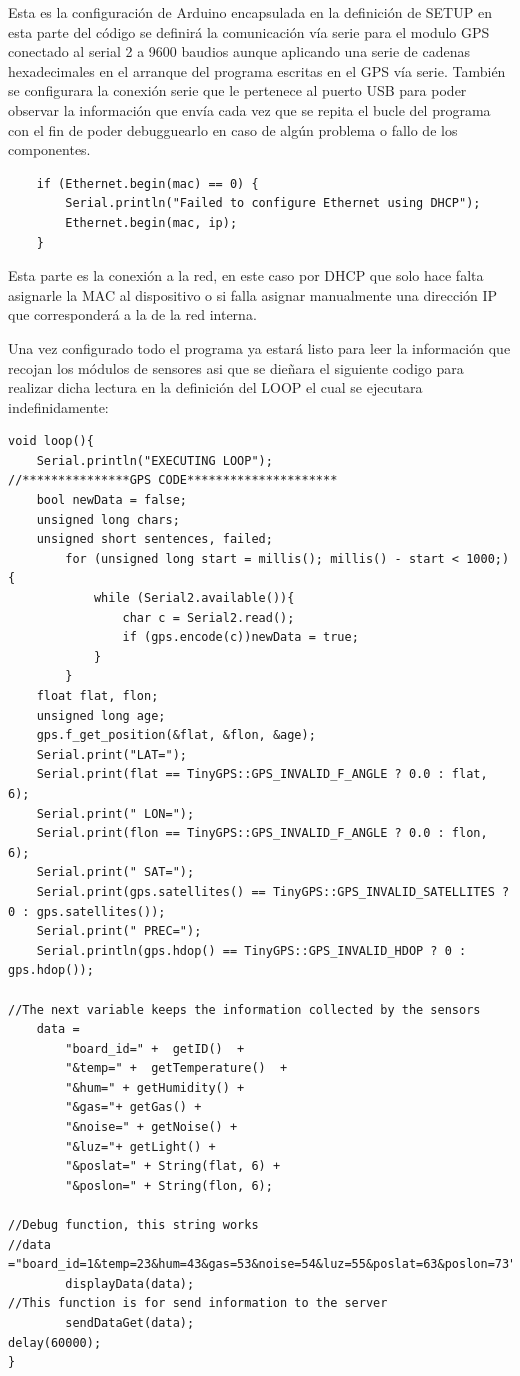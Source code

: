 Esta es la configuración de Arduino encapsulada en la definición de SETUP en esta parte del código se definirá la comunicación vía serie para el modulo GPS conectado al serial 2 a 9600 baudios aunque aplicando una serie de cadenas hexadecimales en el arranque del programa escritas en el GPS vía serie.
También se configurara la conexión serie que le pertenece al puerto USB para poder observar la información que envía cada vez que se repita el bucle del programa con el fin de poder debugguearlo en caso de algún problema o fallo de los componentes.\\

\begin{lstlisting}
	if (Ethernet.begin(mac) == 0) {
		Serial.println("Failed to configure Ethernet using DHCP");
		Ethernet.begin(mac, ip);
	}
\end{lstlisting}
Esta parte es la conexión a la red, en este caso por DHCP que solo hace falta asignarle la MAC al dispositivo o si falla asignar manualmente una dirección IP que corresponderá a la de la red interna.

Una vez configurado todo el programa ya estará listo para leer la información que recojan los módulos de sensores asi que se dieñara el siguiente codigo para realizar dicha lectura en la definición del LOOP el cual se ejecutara indefinidamente:\\

\begin{lstlisting}
void loop(){
	Serial.println("EXECUTING LOOP");
//***************GPS CODE*********************
	bool newData = false;
	unsigned long chars;
	unsigned short sentences, failed;
		for (unsigned long start = millis(); millis() - start < 1000;){
			while (Serial2.available()){
				char c = Serial2.read();
				if (gps.encode(c))newData = true;
			}
		}
	float flat, flon;
	unsigned long age;
	gps.f_get_position(&flat, &flon, &age);
	Serial.print("LAT=");
	Serial.print(flat == TinyGPS::GPS_INVALID_F_ANGLE ? 0.0 : flat, 6);
	Serial.print(" LON=");
	Serial.print(flon == TinyGPS::GPS_INVALID_F_ANGLE ? 0.0 : flon, 6);
	Serial.print(" SAT=");
	Serial.print(gps.satellites() == TinyGPS::GPS_INVALID_SATELLITES ? 0 : gps.satellites());
	Serial.print(" PREC=");
	Serial.println(gps.hdop() == TinyGPS::GPS_INVALID_HDOP ? 0 : gps.hdop());

//The next variable keeps the information collected by the sensors
	data = 
		"board_id=" +  getID()  +
		"&temp=" +  getTemperature()  + 
		"&hum=" + getHumidity() +
		"&gas="+ getGas() + 
		"&noise=" + getNoise() +
		"&luz="+ getLight() + 
		"&poslat=" + String(flat, 6) + 
		"&poslon=" + String(flon, 6);

//Debug function, this string works
//data ="board_id=1&temp=23&hum=43&gas=53&noise=54&luz=55&poslat=63&poslon=73";
		displayData(data);
//This function is for send information to the server
		sendDataGet(data);
delay(60000);
}
\end{lstlisting}

